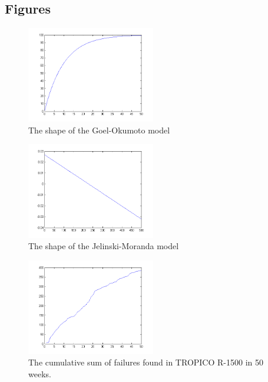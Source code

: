 \subsection*{Figures}

\begin{figure}[htb!]
\centering
	\includegraphics[width=0.5\textwidth]{mshape.png}
\caption{The shape of the Goel-Okumoto model}
\label{goelokumoto}
\end{figure}

\begin{figure}[htb!]
\centering
	\includegraphics[width=0.5\textwidth]{jmshape.png}
\caption{The shape of the Jelinski-Moranda model}
\label{jelinskimoranda}
\end{figure}

\begin{figure}[htb!]
\begin{center}
	\includegraphics[width=0.5\textwidth]{cumsumgodata1plot.png}
\caption{The cumulative sum of failures found in TROPICO R-1500 in 50 weeks.}
\end{center}
\label{cumulativegodata1}
\end{figure}

